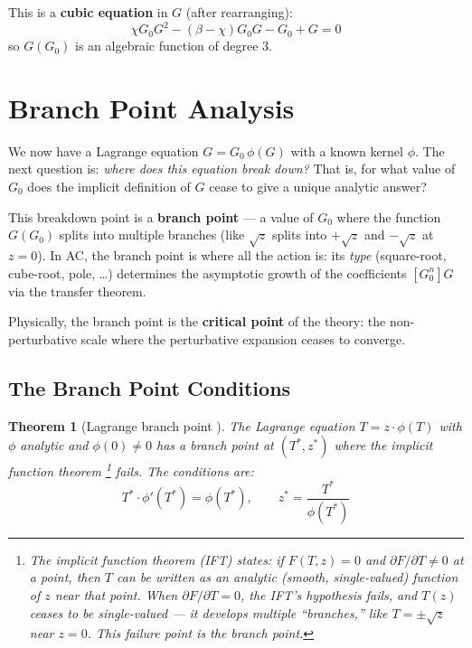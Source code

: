 \documentclass[11pt,a4paper]{article}
\newtheorem{theorem}{Theorem}[section]
\theoremstyle{definition}
\begin{document}
This is a \textbf{cubic equation} in $G$ (after rearranging):
\begin{equation}
\chi G_0 G^2 - (\beta - \chi)G_0 G - G_0 + G = 0
\end{equation}
so $G(G_0)$ is an algebraic function of degree 3.

\section{Branch Point Analysis}
\label{sec:branch}

We now have a Lagrange equation $G = G_0\,\phi(G)$ with a known kernel
$\phi$. The next question is: \emph{where does this equation break down?}
That is, for what value of $G_0$ does the implicit definition of $G$
cease to give a unique analytic answer?

This breakdown point is a \textbf{branch point} --- a value of $G_0$ where
the function $G(G_0)$ splits into multiple branches (like $\sqrt{z}$ splits
into $+\sqrt{z}$ and $-\sqrt{z}$ at $z = 0$). In AC, the branch point is
where all the action is: its \emph{type} (square-root, cube-root, pole,
\ldots) determines the asymptotic growth of the coefficients $[G_0^n]G$
via the transfer theorem.

Physically, the branch point is the \textbf{critical point} of the theory:
the non-perturbative scale where the perturbative expansion ceases to
converge.

\subsection{The Branch Point Conditions}

\begin{theorem}[Lagrange branch point {\cite[Thm.~A.5]{flajolet2009}}]
\label{thm:branch_point}
The Lagrange equation $T = z \cdot \phi(T)$ with $\phi$ analytic and
$\phi(0) \neq 0$ has a branch point at $(T^*, z^*)$ where the implicit
function theorem%
\footnote{The implicit function theorem (IFT) states: if $F(T,z) = 0$
and $\partial F/\partial T \neq 0$ at a point, then $T$ can be written as
an analytic (smooth, single-valued) function of $z$ near that point.
When $\partial F/\partial T = 0$, the IFT's hypothesis fails, and $T(z)$
ceases to be single-valued --- it develops multiple ``branches,'' like
$T = \pm\sqrt{z}$ near $z = 0$. This failure point is the branch point.}
fails. The conditions are:
\begin{equation}
\boxed{
T^* \cdot \phi'(T^*) = \phi(T^*), \qquad z^* = \frac{T^*}{\phi(T^*)}
}
\label{eq:bp_conditions}
\end{equation}
\end{theorem}
\end{document}
